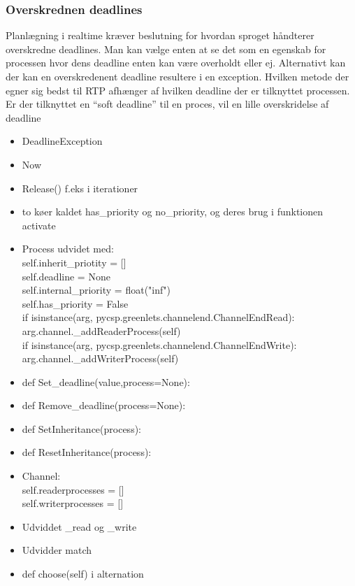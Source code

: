 \subsubsection{Overskrednen deadlines}
Planlægning i realtime kræver beslutning for hvordan sproget håndterer overskredne deadlines. Man kan vælge enten at se det som en egenskab for processen hvor dens deadline enten kan være overholdt eller ej. Alternativt kan der kan en overskredenent deadline resultere i en exception. Hvilken metode der egner sig bedst til RTP afhænger af hvilken deadline der er tilknyttet processen. Er der tilknyttet en ``soft deadline'' til en proces, vil en lille overskridelse af deadline
\begin{itemize}
\item DeadlineException
\item Now
\item Release() f.eks i iterationer
\item to køer kaldet has\_priority og no\_priority, og deres brug i funktionen activate
\item Process udvidet med: \\self.inherit\_priotity = []     \\
        self.deadline = None\\
        self.internal\_priority = float("inf")\\
        self.has\_priority = False\\
            if isinstance(arg, pycsp.greenlets.channelend.ChannelEndRead):\\
                arg.channel.\_addReaderProcess(self)\\
            if isinstance(arg, pycsp.greenlets.channelend.ChannelEndWrite):\\
                arg.channel.\_addWriterProcess(self)
\item def Set\_deadline(value,process=None):
\item def Remove\_deadline(process=None):
\item def SetInheritance(process):
\item def ResetInheritance(process):
\item Channel:\\
        self.readerprocesses = []\\
        self.writerprocesses = []

\item Udviddet \_read og \_write
\item Udvidder match
\item     def choose(self) i alternation


\end{itemize}
